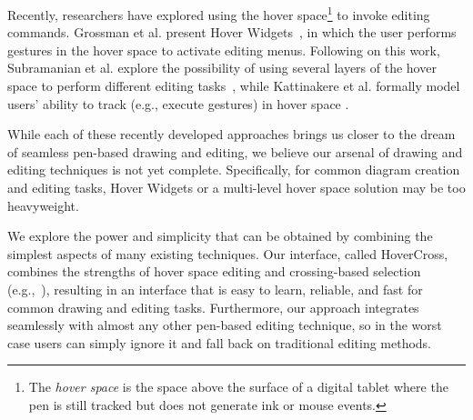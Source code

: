 \documentclass{article}
\begin{document}
Recently, researchers have explored using the hover space\footnote{The
\textit{hover space} is the space above the surface of a digital
tablet where the pen is still tracked but does not generate ink or
mouse events.} to invoke editing commands.  Grossman et al. present
Hover Widgets~\cite{Grossman2006Hover}, in which the user performs
gestures in the hover space to activate editing menus.  Following on
this work, Subramanian et al. explore the possibility of using several
layers of the hover space to perform different editing
tasks~\cite{Subramanian2006Multilayer}, while Kattinakere et
al. formally model users' ability to track (e.g., execute gestures) in
hover space \cite{Kattinakere2007Modeling}.


While each of these recently developed approaches brings us closer to
the dream of seamless pen-based drawing and editing, we believe our
arsenal of drawing and editing techniques is not yet complete.  Specifically, for common diagram creation and editing tasks, Hover
Widgets or a multi-level hover space solution may be too heavyweight.

We explore the power and simplicity that can be obtained by combining
the simplest aspects of many existing techniques.  Our interface,
called HoverCross, combines the strengths of hover space editing and
crossing-based selection (e.g.,~\cite{Apitz2004Crossy}),
resulting in an interface that is easy to learn, reliable, and fast
for common drawing and editing tasks.  Furthermore, our
approach integrates seamlessly with almost any other pen-based editing
technique, so in the worst case users can simply ignore it and fall
back on traditional editing methods.


\end{document}
